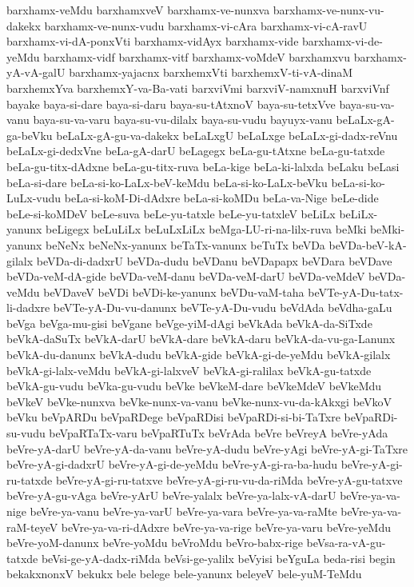 {barxhamx-veMdu
barxhamxveV
barxhamx-ve-nunxva
barxhamx-ve-nunx-vu-dakekx
barxhamx-ve-nunx-vudu
barxhamx-vi-cAra
barxhamx-vi-cA-ravU
barxhamx-vi-dA-ponxVti
barxhamx-vidAyx
barxhamx-vide
barxhamx-vi-de-yeMdu
barxhamx-vidf
barxhamx-vitf
barxhamx-voMdeV
barxhamxvu
barxhamx-yA-vA-galU
barxhamx-yajacnx
barxhemxVti
barxhemxV-ti-vA-dinaM
barxhemxYva
barxhemxY-va-Ba-vati
barxviVmi
barxviV-namxnuH
barxviVnf
bayake
baya-si-dare
baya-si-daru
baya-su-tAtxnoV
baya-su-tetxVve
baya-su-va-vanu
baya-su-va-varu
baya-su-vu-dilalx
baya-su-vudu
bayuyx-vanu
beLaLx-gA-ga-beVku
beLaLx-gA-gu-va-dakekx
beLaLxgU
beLaLxge
beLaLx-gi-dadx-reVnu
beLaLx-gi-dedxVne
beLa-gA-darU
beLagegx
beLa-gu-tAtxne
beLa-gu-tatxde
beLa-gu-titx-dAdxne
beLa-gu-titx-ruva
beLa-kige
beLa-ki-lalxda
beLaku
beLasi
beLa-si-dare
beLa-si-ko-LaLx-beV-keMdu
beLa-si-ko-LaLx-beVku
beLa-si-ko-LuLx-vudu
beLa-si-koM-Di-dAdxre
beLa-si-koMDu
beLa-va-Nige
beLe-dide
beLe-si-koMDeV
beLe-suva
beLe-yu-tatxle
beLe-yu-tatxleV
beLiLx
beLiLx-yanunx
beLigegx
beLuLiLx
beLuLxLiLx
beMga-LU-ri-na-lilx-ruva
beMki
beMki-yanunx
beNeNx
beNeNx-yanunx
beTaTx-vanunx
beTuTx
beVDa
beVDa-beV-kA-gilalx
beVDa-di-dadxrU
beVDa-dudu
beVDanu
beVDapapx
beVDara
beVDave
beVDa-veM-dA-gide
beVDa-veM-danu
beVDa-veM-darU
beVDa-veMdeV
beVDa-veMdu
beVDaveV
beVDi
beVDi-ke-yanunx
beVDu-vaM-taha
beVTe-yA-Du-tatx-li-dadxre
beVTe-yA-Du-vu-danunx
beVTe-yA-Du-vudu
beVdAda
beVdha-gaLu
beVga
beVga-mu-gisi
beVgane
beVge-yiM-dAgi
beVkAda
beVkA-da-SiTxde
beVkA-daSuTx
beVkA-darU
beVkA-dare
beVkA-daru
beVkA-da-vu-ga-Lanunx
beVkA-du-danunx
beVkA-dudu
beVkA-gide
beVkA-gi-de-yeMdu
beVkA-gilalx
beVkA-gi-lalx-veMdu
beVkA-gi-lalxveV
beVkA-gi-ralilax
beVkA-gu-tatxde
beVkA-gu-vudu
beVka-gu-vudu
beVke
beVkeM-dare
beVkeMdeV
beVkeMdu
beVkeV
beVke-nunxva
beVke-nunx-va-vanu
beVke-nunx-vu-da-kAkxgi
beVkoV
beVku
beVpARDu
beVpaRDege
beVpaRDisi
beVpaRDi-si-bi-TaTxre
beVpaRDi-su-vudu
beVpaRTaTx-varu
beVpaRTuTx
beVrAda
beVre
beVreyA
beVre-yAda
beVre-yA-darU
beVre-yA-da-vanu
beVre-yA-dudu
beVre-yAgi
beVre-yA-gi-TaTxre
beVre-yA-gi-dadxrU
beVre-yA-gi-de-yeMdu
beVre-yA-gi-ra-ba-hudu
beVre-yA-gi-ru-tatxde
beVre-yA-gi-ru-tatxve
beVre-yA-gi-ru-vu-da-riMda
beVre-yA-gu-tatxve
beVre-yA-gu-vAga
beVre-yArU
beVre-yalalx
beVre-ya-lalx-vA-darU
beVre-ya-va-nige
beVre-ya-vanu
beVre-ya-varU
beVre-ya-vara
beVre-ya-va-raMte
beVre-ya-va-raM-teyeV
beVre-ya-va-ri-dAdxre
beVre-ya-va-rige
beVre-ya-varu
beVre-yeMdu
beVre-yoM-danunx
beVre-yoMdu
beVroMdu
beVro-babx-rige
beVsa-ra-vA-gu-tatxde
beVsi-ge-yA-dadx-riMda
beVsi-ge-yalilx
beVyisi
beYguLa
beda-risi
begin
bekakxnonxV
bekukx
bele
belege
bele-yanunx
beleyeV
bele-yuM-TeMdu
}
